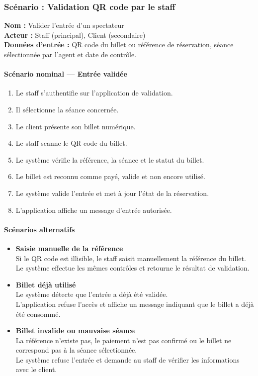 \documentclass[12pt]{report}
\begin{document}
\subsubsection{Scénario : Validation QR code par le staff}

\textbf{Nom :} Valider l'entrée d'un spectateur \\
\textbf{Acteur :} Staff (principal), Client (secondaire) \\
\textbf{Données d'entrée :} QR code du billet ou référence de réservation,
séance sélectionnée par l'agent et date de contrôle.

\paragraph{Scénario nominal — Entrée validée}
\begin{enumerate}
    \item Le staff s'authentifie sur l'application de validation.
    \item Il sélectionne la séance concernée.
    \item Le client présente son billet numérique.
    \item Le staff scanne le QR code du billet.
    \item Le système vérifie la référence, la séance et le statut du billet.
    \item Le billet est reconnu comme payé, valide et non encore utilisé.
    \item Le système valide l'entrée et met à jour l'état de la réservation.
    \item L'application affiche un message d'entrée autorisée.
\end{enumerate}

\paragraph{Scénarios alternatifs}
\begin{itemize}
    \item[\textbf{A.}] \textbf{Saisie manuelle de la référence} \\
        Si le QR code est illisible, le staff saisit manuellement la référence
        du billet. \\
        Le système effectue les mêmes contrôles et retourne le résultat de
        validation.

    \item[\textbf{B.}] \textbf{Billet déjà utilisé} \\
        Le système détecte que l'entrée a déjà été validée. \\
        L'application refuse l'accès et affiche un message indiquant que le
        billet a déjà été consommé.

    \item[\textbf{C.}] \textbf{Billet invalide ou mauvaise séance} \\
        La référence n'existe pas, le paiement n'est pas confirmé ou le billet
        ne correspond pas à la séance sélectionnée. \\
        Le système refuse l'entrée et demande au staff de vérifier les
        informations avec le client.
\end{itemize}
\end{document}

